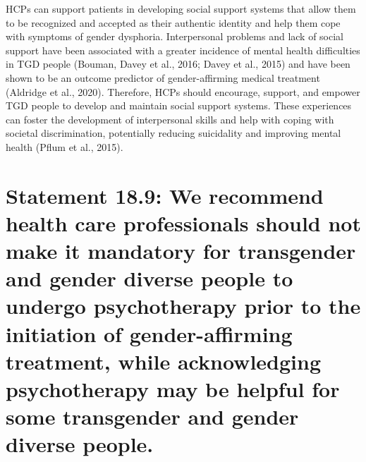 \documentclass[
]{book}
\begin{document}
HCPs can support patients in developing social
support systems that allow them to be recognized
and accepted as their authentic identity and help
them cope with symptoms of gender dysphoria.
Interpersonal problems and lack of social support
have been associated with a greater incidence of
mental health difficulties in TGD people (Bouman,
Davey et al., 2016; Davey et al., 2015) and have
been shown to be an outcome predictor of
gender-affirming medical treatment (Aldridge
et al., 2020). Therefore, HCPs should encourage,
support, and empower TGD people to develop
and maintain social support systems. These experiences can foster the development of interpersonal skills and help with coping with societal
discrimination, potentially reducing suicidality
and improving mental health (Pflum et al., 2015).

\hypertarget{statement-18.9-we-recommend-health-care-professionals-should-not-make-it-mandatory-for-transgender-and-gender-diverse-people-to-undergo-psychotherapy-prior-to-the-initiation-of-gender-affirming-treatment-while-acknowledging-psychotherapy-may-be-helpful-for-some-transgender-and-gender-diverse-people.}{%
\section*{Statement 18.9: We recommend health care professionals should not make it mandatory for transgender and gender diverse people to undergo psychotherapy prior to the initiation of gender-affirming treatment, while acknowledging psychotherapy may be helpful for some transgender and gender diverse people.}\label{statement-18.9-we-recommend-health-care-professionals-should-not-make-it-mandatory-for-transgender-and-gender-diverse-people-to-undergo-psychotherapy-prior-to-the-initiation-of-gender-affirming-treatment-while-acknowledging-psychotherapy-may-be-helpful-for-some-transgender-and-gender-diverse-people.}}
\end{document}
